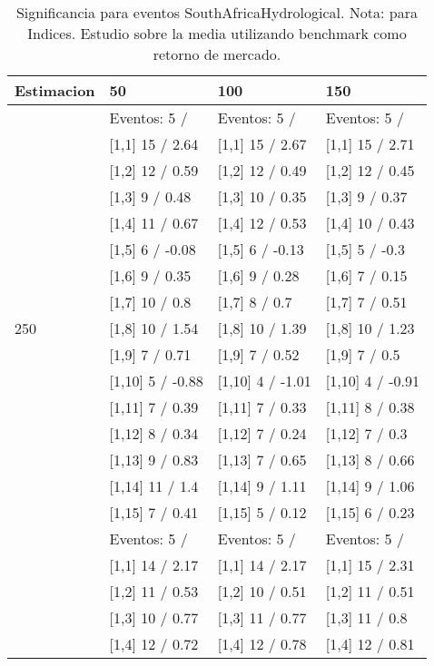\begin{table}

\caption{Significancia para eventos SouthAfricaHydrological. Nota: para Indices. Estudio sobre la media utilizando benchmark como retorno de mercado.}
\centering
\begin{tabular}[t]{llll}
\toprule
Estimacion & 50 & 100 & 150\\
\midrule
 & Eventos:  5 / & Eventos:  5 / & Eventos:  5 /\\
 & {}[1,1] 15  / 2.64 & {}[1,1] 15  / 2.67 & {}[1,1] 15  / 2.71\\
 & {}[1,2] 12  / 0.59 & {}[1,2] 12  / 0.49 & {}[1,2] 12  / 0.45\\
 & {}[1,3] 9  / 0.48 & {}[1,3] 10  / 0.35 & {}[1,3] 9  / 0.37\\
 & {}[1,4] 11  / 0.67 & {}[1,4] 12  / 0.53 & {}[1,4] 10  / 0.43\\
\addlinespace
 & {}[1,5] 6  / -0.08 & {}[1,5] 6  / -0.13 & {}[1,5] 5  / -0.3\\
 & {}[1,6] 9  / 0.35 & {}[1,6] 9  / 0.28 & {}[1,6] 7  / 0.15\\
 & {}[1,7] 10  / 0.8 & {}[1,7] 8  / 0.7 & {}[1,7] 7  / 0.51\\
250 & {}[1,8] 10  / 1.54 & {}[1,8] 10  / 1.39 & {}[1,8] 10  / 1.23\\
 & {}[1,9] 7  / 0.71 & {}[1,9] 7  / 0.52 & {}[1,9] 7  / 0.5\\
\addlinespace
 & {}[1,10] 5  / -0.88 & {}[1,10] 4  / -1.01 & {}[1,10] 4  / -0.91\\
 & {}[1,11] 7  / 0.39 & {}[1,11] 7  / 0.33 & {}[1,11] 8  / 0.38\\
 & {}[1,12] 8  / 0.34 & {}[1,12] 7  / 0.24 & {}[1,12] 7  / 0.3\\
 & {}[1,13] 9  / 0.83 & {}[1,13] 7  / 0.65 & {}[1,13] 8  / 0.66\\
 & {}[1,14] 11  / 1.4 & {}[1,14] 9  / 1.11 & {}[1,14] 9  / 1.06\\
\addlinespace
 & {}[1,15] 7  / 0.41 & {}[1,15] 5  / 0.12 & {}[1,15] 6  / 0.23\\
 & Eventos:  5 / & Eventos:  5 / & Eventos:  5 /\\
 & {}[1,1] 14  / 2.17 & {}[1,1] 14  / 2.17 & {}[1,1] 15  / 2.31\\
 & {}[1,2] 11  / 0.53 & {}[1,2] 10  / 0.51 & {}[1,2] 11  / 0.51\\
 & {}[1,3] 10  / 0.77 & {}[1,3] 11  / 0.77 & {}[1,3] 11  / 0.8\\
\addlinespace
 & {}[1,4] 12  / 0.72 & {}[1,4] 12  / 0.78 & {}[1,4] 12  / 0.81\\

\end{tabular}
\end{table}
